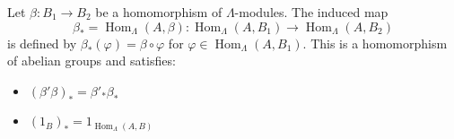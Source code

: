 Let $\beta : B_1 \to B_2$ be a homomorphism of $\Lambda$-modules. The induced map
$$\beta_* = \operatorname{Hom}_\Lambda(A, \beta) : \operatorname{Hom}_\Lambda(A, B_1) \to \operatorname{Hom}_\Lambda(A, B_2)$$
is defined by $\beta_*(\varphi) = \beta \circ \varphi$ for $\varphi \in \operatorname{Hom}_\Lambda(A, B_1)$. This is a homomorphism of abelian groups and satisfies:
\begin{itemize}
\item $(\beta' \beta)_* = \beta'_* \beta_*$
\item $(1_B)_* = 1_{\operatorname{Hom}_\Lambda(A, B)}$
\end{itemize}